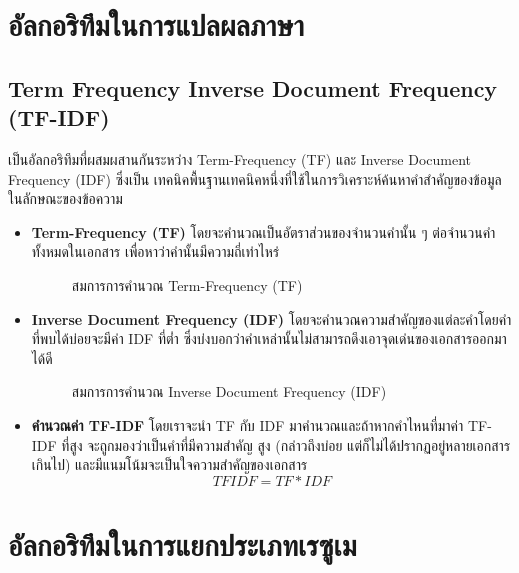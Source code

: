\section{อัลกอริทึมในการแปลผลภาษา}
\subsection{Term Frequency Inverse Document Frequency (TF-IDF)}
เป็นอัลกอริทึมที่ผสมผสานกันระหว่าง Term-Frequency (TF) และ Inverse Document Frequency (IDF) ซึ่งเป็น
เทคนิคพื้นฐานเทคนิคหนึ่งที่ใช้ในการวิเคราะห์ค้นหาคำสำคัญของข้อมูลในลักษณะของข้อความ \cite{tf-idf}
\begin{itemize}
    \item \textbf{Term-Frequency (TF)} โดยจะคำนวณเป็นอัตราส่วนของจำนวนคำนั้น ๆ ต่อจำนวนคำทั้งหมดในเอกสาร
    เพื่อหาว่าคำนั้นมีความถี่เท่าไหร่
    \begin{figure}[!h]\centering
        \setlength{\fboxrule}{0.2mm} %
        \setlength{\fboxsep}{1cm}
        \caption{สมการการคำนวณ Term-Frequency (TF)}\label{fig:model4}
    \end{figure}
    \item \textbf{Inverse Document Frequency (IDF)} โดยจะคำนวณความสำคัญของแต่ละคำโดยคำที่พบได้บ่อยจะมีค่า IDF ที่ต่ำ
    ซึ่งบ่งบอกว่าคำเหล่านั้นไม่สามารถดึงเอาจุดเด่นของเอกสารออกมาได้ดี
    \begin{figure}[!h]\centering
        \setlength{\fboxrule}{0.2mm} %
        \setlength{\fboxsep}{1cm}
        \caption{สมการการคำนวณ Inverse Document Frequency (IDF)}\label{fig:model5}
    \end{figure}
    \item \textbf{คำนวณค่า TF-IDF} โดยเราจะนำ TF กับ IDF มาคำนวณและถ้าหากคำไหนที่มาค่า TF-IDF ที่สูง จะถูกมองว่าเป็นคำที่มีความสำคัญ
    สูง (กล่าวถึงบ่อย แต่ก็ไม่ได้ปรากฏอยู่หลายเอกสารเกินไป) และมีแนมโน้มจะเป็นใจความสำคัญของเอกสาร
    \[TFIDF = TF * IDF\]
\end{itemize}
\section{อัลกอริทึมในการแยกประเภทเรซูเม}
